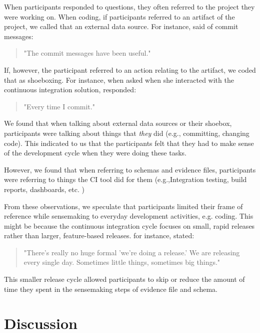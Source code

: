 \documentclass{sig-alternate}
\begin{document}
When participants responded to questions, they often referred to the project they were working on. When coding, if participants referred to an artifact of the project, we called that an external data source. For instance, \srutitwo  said of commit messages: 

\begin{quote}
"The commit messages have been  useful."
\end{quote}


If, however, the participant referred to an action relating to the artifact, we coded that as shoeboxing. For instance, when asked when she interacted with the continuous integration solution, \srutitwo responded: 

\begin{quote}
"Every time I commit."	
\end{quote}

We found that when talking about external data sources  or their shoebox, participants were talking about things that \textit{they} did (e.g., committing, changing code). This indicated to us that the participants felt that they had to make sense of the development cycle when they were doing these tasks. 

However, we found that when referring to schemas and evidence files, participants were referring to things the CI tool did for them (e.g.,Integration testing, build reports, dashboards, etc.
) 

From these observations, we speculate that participants limited their frame of reference while sensemaking to everyday development activities, e.g. coding. This might be because the continuous integration cycle focuses on small, rapid releases rather than larger, feature-based releases. for instance, \cpg stated:

\begin{quote}
"There's really no huge formal 'we're doing a release.' We are releasing every single day. Sometimes little things, sometimes big things."	
\end{quote}


This smaller release cycle allowed participants to skip or reduce the amount of time they spent in the sensemaking steps of evidence file and schema. 

\section{Discussion}
\end{document}
